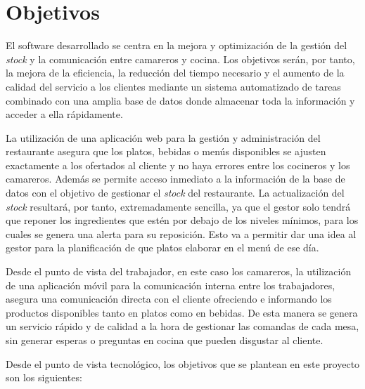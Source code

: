 \section{Objetivos}

El software desarrollado se centra en la mejora y optimización de la gestión del \textit{stock} y la comunicación entre camareros y cocina. Los objetivos serán, por tanto, la mejora de la eficiencia, la reducción del tiempo necesario y el aumento de la calidad del servicio a los clientes mediante un sistema automatizado de tareas combinado con una amplia base de datos donde almacenar toda la información y acceder a ella rápidamente.

La utilización de una aplicación web para la gestión y administración del restaurante asegura que los platos, bebidas o menús disponibles se ajusten exactamente a los ofertados al cliente y no haya errores entre los cocineros y los camareros. Además se permite acceso inmediato a la información de la base de datos con el objetivo de gestionar el \textit{stock} del restaurante. La actualización del \textit{stock} resultará, por tanto, extremadamente sencilla, ya que el gestor solo tendrá que reponer los ingredientes que estén por debajo de los niveles mínimos, para los cuales se genera una alerta para su reposición. Esto va a permitir dar una idea al gestor para la planificación de que platos elaborar en el menú de ese día.

Desde el punto de vista del trabajador, en este caso los camareros, la utilización de una aplicación móvil para la comunicación interna entre los trabajadores, asegura una comunicación directa con el cliente ofreciendo e informando los productos disponibles tanto en platos como en bebidas. De esta manera se genera un servicio rápido y de calidad a la hora de gestionar las comandas de cada mesa, sin generar esperas o preguntas en cocina que pueden disgustar al cliente.

Desde el punto de vista tecnológico, los objetivos que se plantean en este proyecto son los siguientes:

